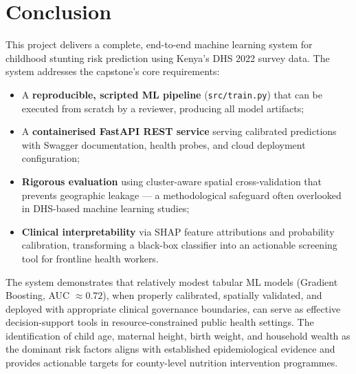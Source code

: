 \documentclass[12pt, a4paper]{article}
\begin{document}
\section{Conclusion}

This project delivers a complete, end-to-end machine learning system for childhood stunting risk prediction using Kenya's DHS 2022 survey data. The system addresses the capstone's core requirements:

\begin{itemize}
    \item A \textbf{reproducible, scripted ML pipeline} (\texttt{src/train.py}) that can be executed from scratch by a reviewer, producing all model artifacts;
    \item A \textbf{containerised FastAPI REST service} serving calibrated predictions with Swagger documentation, health probes, and cloud deployment configuration;
    \item \textbf{Rigorous evaluation} using cluster-aware spatial cross-validation that prevents geographic leakage — a methodological safeguard often overlooked in DHS-based machine learning studies;
    \item \textbf{Clinical interpretability} via SHAP feature attributions and probability calibration, transforming a black-box classifier into an actionable screening tool for frontline health workers.
\end{itemize}

The system demonstrates that relatively modest tabular ML models (Gradient Boosting, AUC $\approx 0.72$), when properly calibrated, spatially validated, and deployed with appropriate clinical governance boundaries, can serve as effective decision-support tools in resource-constrained public health settings. The identification of child age, maternal height, birth weight, and household wealth as the dominant risk factors aligns with established epidemiological evidence and provides actionable targets for county-level nutrition intervention programmes.
\end{document}
